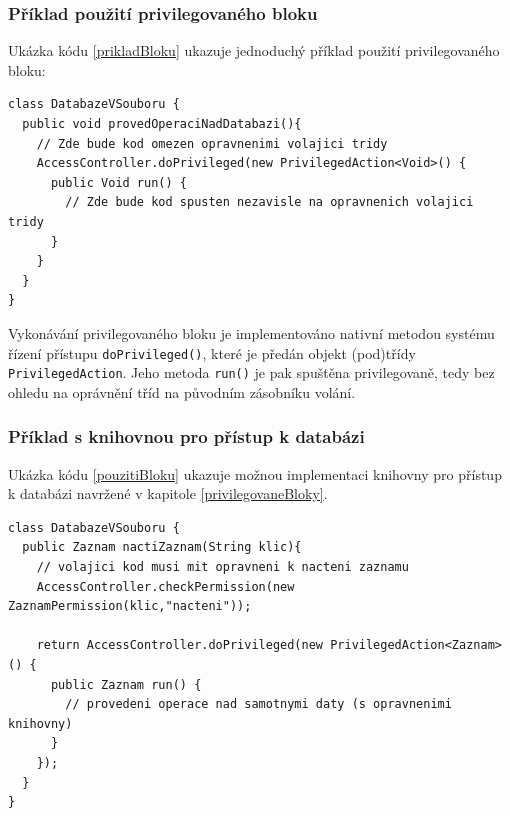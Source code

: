 \subsubsection{Příklad použití privilegovaného bloku}

Ukázka kódu \ref{prikladBloku} ukazuje jednoduchý příklad použití privilegovaného bloku: \cite{refAccessController}

\begin{lstlisting}[caption=Příklad použití privilegovaného bloku, label=prikladBloku]
class DatabazeVSouboru {
  public void provedOperaciNadDatabazi(){
    // Zde bude kod omezen opravnenimi volajici tridy
    AccessController.doPrivileged(new PrivilegedAction<Void>() {
      public Void run() {
        // Zde bude kod spusten nezavisle na opravnenich volajici tridy
      }
    }
  }
}
\end{lstlisting}

Vykonávání privilegovaného bloku je implementováno nativní metodou systému řízení přístupu {\tt doPrivileged()}, které je předán objekt (pod)třídy {\tt PrivilegedAction}. Jeho metoda {\tt run()} je pak spuštěna privilegovaně, tedy bez ohledu na oprávnění tříd na původním zásobníku volání.

\subsubsection{Příklad s knihovnou pro přístup k databázi}\label{databazeVsouboru}

Ukázka kódu \ref{pouzitiBloku} ukazuje možnou implementaci knihovny pro přístup k databázi navržené v kapitole \ref{privilegovaneBloky}.

\begin{lstlisting}[caption=Demonstrační knihovna pro přístup k databázi, label=pouzitiBloku]
class DatabazeVSouboru {
  public Zaznam nactiZaznam(String klic){
    // volajici kod musi mit opravneni k nacteni zaznamu
    AccessController.checkPermission(new ZaznamPermission(klic,"nacteni"));
    
    return AccessController.doPrivileged(new PrivilegedAction<Zaznam>() {
      public Zaznam run() {
        // provedeni operace nad samotnymi daty (s opravnenimi knihovny)
      }
    });
  }
}
\end{lstlisting}

